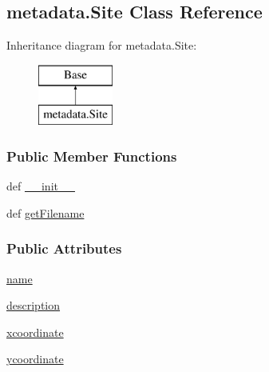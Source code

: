 \hypertarget{classmetadata_1_1Site}{\subsection{metadata.\-Site Class Reference}
\label{classmetadata_1_1Site}
}
Inheritance diagram for metadata.\-Site\-:\begin{figure}[H]
\begin{center}
\leavevmode
\includegraphics[height=2.000000cm]{classmetadata_1_1Site}
\end{center}
\end{figure}
\subsubsection*{Public Member Functions}
\begin{DoxyCompactItemize}
\item 
def \hyperlink{classmetadata_1_1Site_ad57535edf80c4449761c45096b927cca}{\-\_\-\-\_\-init\-\_\-\-\_\-}
\item 
def \hyperlink{classmetadata_1_1Site_a390d3982f7b25d5575c36b049a0fe8b5}{get\-Filename}
\end{DoxyCompactItemize}
\subsubsection*{Public Attributes}
\begin{DoxyCompactItemize}
\item 
\hyperlink{classmetadata_1_1Site_a3c1394a5dc75c64eadf4effd1600559e}{name}
\item 
\hyperlink{classmetadata_1_1Site_a3e551cc113158cbba76735db9d6ce6b5}{description}
\item 
\hyperlink{classmetadata_1_1Site_a4bd6d28c540b025bb434c73009e43323}{xcoordinate}
\item 
\hyperlink{classmetadata_1_1Site_a69815891e74eb04ed78c879ad495ddc7}{ycoordinate}
\end{DoxyCompactItemize}
